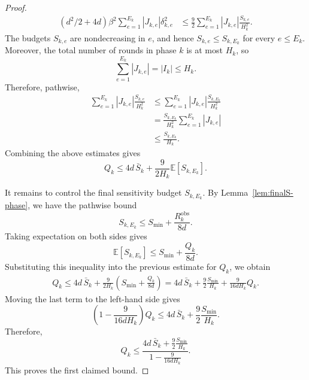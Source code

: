 \documentclass[journal,onecolumn]{IEEEtran}
\theoremstyle{plain}
\theoremstyle{definition}
\theoremstyle{remark}
\begin{document}
{\begin{proof}
\begin{equation*}
\begin{aligned}
    (d^2/2+4d)\beta^2
    \sum_{e=1}^{E_k}|J_{k,e}|\delta_{k,e}^2
    &\le
    \frac92
    \sum_{e=1}^{E_k}
    |J_{k,e}|\frac{S_{k,e}}{H_k^2}.
\end{aligned}
\end{equation*}
The budgets $S_{k,e}$ are nondecreasing in $e$, and hence
$S_{k,e}\le S_{k,E_k}$ for every $e\le E_k$. Moreover, the total number of
rounds in phase $k$ is at most $H_k$, so
\begin{equation*}
    \sum_{e=1}^{E_k}|J_{k,e}|=|I_k|\le H_k.
\end{equation*}
Therefore, pathwise,
\begin{equation*}
\begin{aligned}
    \sum_{e=1}^{E_k}
    |J_{k,e}|\frac{S_{k,e}}{H_k^2}
    &\le
    \sum_{e=1}^{E_k}
    |J_{k,e}|\frac{S_{k,E_k}}{H_k^2}  \\
    &=
    \frac{S_{k,E_k}}{H_k^2}
    \sum_{e=1}^{E_k}|J_{k,e}|  \\
    &\le
    \frac{S_{k,E_k}}{H_k}.
\end{aligned}
\end{equation*}
Combining the above estimates gives
\begin{equation*}
    Q_k
    \le
    4d\,\bar S_k
    +
    \frac{9}{2H_k}\mathbb E[S_{k,E_k}].
\end{equation*}

It remains to control the final sensitivity budget $S_{k,E_k}$. By
Lemma~\ref{lem:finalS-phase}, we have the pathwise bound
\begin{equation*}
    S_{k,E_k}
    \le
    S_{\min}
    +
    \frac{R_k^{\mathrm{obs}}}{8d}.
\end{equation*}
Taking expectation on both sides gives
\begin{equation*}
    \mathbb E[S_{k,E_k}]
    \le
    S_{\min}
    +
    \frac{Q_k}{8d}.
\end{equation*}
Substituting this inequality into the previous estimate for $Q_k$, we obtain
\begin{equation*}
\begin{aligned}
    Q_k
    \le
    4d\,\bar S_k
    +
    \frac{9}{2H_k}
    \left(
        S_{\min}
        +
        \frac{Q_k}{8d}
    \right)  =
    4d\,\bar S_k
    +
    \frac{9}{2}\frac{S_{\min}}{H_k}
    +
    \frac{9}{16dH_k}Q_k.
\end{aligned}
\end{equation*}
Moving the last term to the left-hand side gives
\begin{equation*}
    \left(
        1-\frac{9}{16dH_k}
    \right)Q_k
    \le
    4d\,\bar S_k
    +
    \frac{9}{2}\frac{S_{\min}}{H_k}.
\end{equation*}
Therefore,
\begin{equation*}
    Q_k
    \le
    \frac{
        4d\,\bar S_k+\frac{9}{2}\frac{S_{\min}}{H_k}
    }{
        1-\frac{9}{16dH_k}
    }.
\end{equation*}
This proves the first claimed bound.


\end{proof}}
\end{document}
